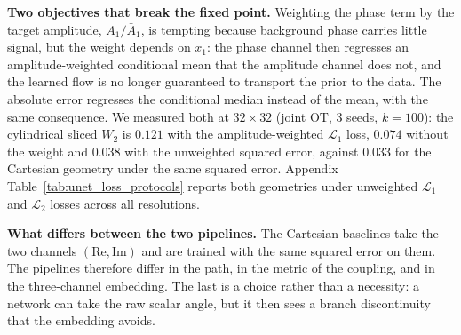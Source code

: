 \textbf{Two objectives that break the fixed point.} Weighting the phase term by the target amplitude, $A_1/\bar{A}_1$, is tempting because background phase carries little signal, but the weight depends on $x_1$: the phase channel then regresses an amplitude-weighted conditional mean that the amplitude channel does not, and the learned flow is no longer guaranteed to transport the prior to the data. The absolute error regresses the conditional median instead of the mean, with the same consequence. We measured both at $32\times32$ (joint OT, 3 seeds, $k=100$): the cylindrical sliced $W_2$ is $0.121$ with the amplitude-weighted $\mathcal{L}_1$ loss, $0.074$ without the weight and $0.038$ with the unweighted squared error, against $0.033$ for the Cartesian geometry under the same squared error. Appendix Table~\ref{tab:unet_loss_protocols} reports both geometries under unweighted $\mathcal{L}_1$ and $\mathcal{L}_2$ losses across all resolutions.

\textbf{What differs between the two pipelines.} The Cartesian baselines take the two channels $(\mathrm{Re}, \mathrm{Im})$ and are trained with the same squared error on them. The pipelines therefore differ in the path, in the metric of the coupling, and in the three-channel embedding. The last is a choice rather than a necessity: a network can take the raw scalar angle, but it then sees a branch discontinuity that the embedding avoids.
